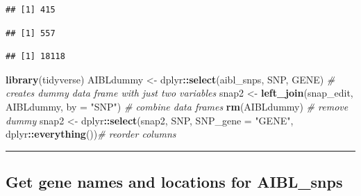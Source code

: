 \documentclass[]{article}
\newenvironment{Shaded}{\begin{snugshade}}{\end{snugshade}}
\newcommand{\KeywordTok}[1]{\textcolor[rgb]{0.13,0.29,0.53}{\textbf{#1}}}
\newcommand{\DataTypeTok}[1]{\textcolor[rgb]{0.13,0.29,0.53}{#1}}
\newcommand{\StringTok}[1]{\textcolor[rgb]{0.31,0.60,0.02}{#1}}
\newcommand{\CommentTok}[1]{\textcolor[rgb]{0.56,0.35,0.01}{\textit{#1}}}
\newcommand{\OperatorTok}[1]{\textcolor[rgb]{0.81,0.36,0.00}{\textbf{#1}}}
\newcommand{\NormalTok}[1]{#1}
\begin{document}
\begin{verbatim}
## [1] 415
\end{verbatim}

\begin{Shaded}
\end{Shaded}

\begin{verbatim}
## [1] 557
\end{verbatim}

\begin{Shaded}
\end{Shaded}

\begin{verbatim}
## [1] 18118
\end{verbatim}

\begin{Shaded}
\begin{Highlighting}[]
\KeywordTok{library}\NormalTok{(tidyverse)}
\NormalTok{AIBLdummy <-}\StringTok{ }\NormalTok{dplyr}\OperatorTok{::}\KeywordTok{select}\NormalTok{(aibl_snps, SNP, GENE) }\CommentTok{# creates dummy data frame with just two variables}
\NormalTok{snap2 <-}\StringTok{ }\KeywordTok{left_join}\NormalTok{(snap_edit, AIBLdummy, }\DataTypeTok{by =} \StringTok{"SNP"}\NormalTok{) }\CommentTok{# combine data frames}
\KeywordTok{rm}\NormalTok{(AIBLdummy) }\CommentTok{# remove dummy}
\NormalTok{snap2 <-}\StringTok{ }\NormalTok{dplyr}\OperatorTok{::}\KeywordTok{select}\NormalTok{(snap2, SNP, }\DataTypeTok{SNP_gene =} \StringTok{"GENE"}\NormalTok{, dplyr}\OperatorTok{::}\KeywordTok{everything}\NormalTok{())}\CommentTok{# reorder columns}
\end{Highlighting}
\end{Shaded}

\begin{center}\rule{0.5\linewidth}{\linethickness}\end{center}

\subsection{Get gene names and locations for
AIBL\_snps}\label{get-gene-names-and-locations-for-aibl_snps}
\end{document}
